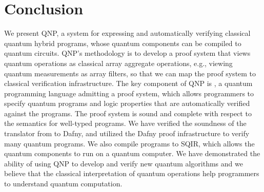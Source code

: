 \section{Conclusion}

We present QNP, a system for expressing and automatically verifying classical quantum hybrid programs, whose quantum components can be compiled to quantum circuits. QNP's methodology is to develop a proof system that views quantum operations as classical array aggregate operations, e.g., viewing quantum measurements as array filters, so that we can map the proof system to classical verification infrastructure. 
The key component of QNP is \qafny, a quantum programming language admitting a proof system, which allows programmers to specify quantum programs and logic properties that are automatically verified against the programs.
The \qafny proof system is sound and complete with respect to the \qafny semantics for well-typed \qafny programs. 
We have verified the soundness of the translator from \qafny to Dafny, and utilized the Dafny proof infrastructure to verify many quantum programs. We also compile \qafny programs to SQIR, which allows the quantum components to run on a quantum computer.
We have demonstrated the ability of using QNP to develop and verify new quantum algorithms and we believe that the classical interpretation of quantum operations help programmers to understand quantum computation. 
